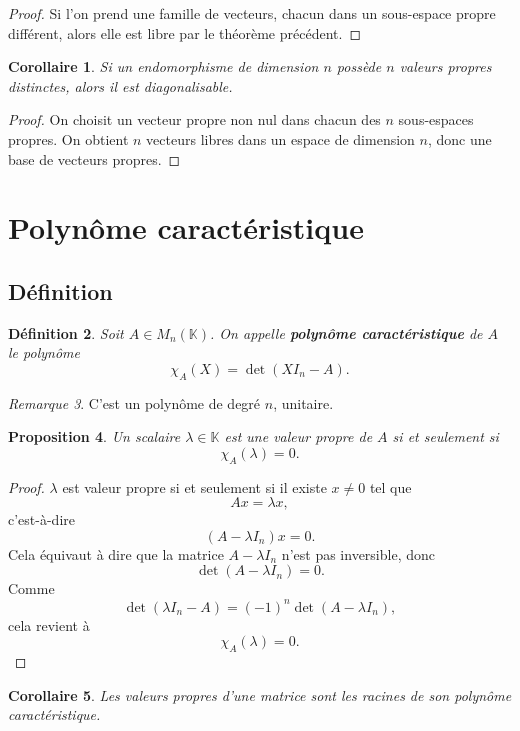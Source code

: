 \documentclass[11pt,a4paper]{article}
\newtheorem{definition}{Définition}[section]
\newtheorem{proposition}[definition]{Proposition}
\newtheorem{corollaire}[definition]{Corollaire}
\theoremstyle{remark}
\newtheorem{remarque}[definition]{Remarque}
\newcommand{\K}{\mathbb{K}}
\newcommand{\chiA}{\chi_A}
\begin{document}
\begin{proof}
Si l’on prend une famille de vecteurs, chacun dans un sous-espace propre différent, alors elle est libre par le théorème précédent.
\end{proof}

\begin{corollaire}
Si un endomorphisme de dimension \(n\) possède \(n\) valeurs propres distinctes, alors il est diagonalisable.
\end{corollaire}

\begin{proof}
On choisit un vecteur propre non nul dans chacun des \(n\) sous-espaces propres. On obtient \(n\) vecteurs libres dans un espace de dimension \(n\), donc une base de vecteurs propres.
\end{proof}

\section{Polynôme caractéristique}

\subsection{Définition}

\begin{definition}
Soit \(A\in M_n(\K)\).  
On appelle \textbf{polynôme caractéristique} de \(A\) le polynôme
\[
\chiA(X)=\det(XI_n-A).
\]
\end{definition}

\begin{remarque}
C’est un polynôme de degré \(n\), unitaire.
\end{remarque}

\begin{proposition}
Un scalaire \(\lambda\in\K\) est une valeur propre de \(A\) si et seulement si
\[
\chiA(\lambda)=0.
\]
\end{proposition}

\begin{proof}
\(\lambda\) est valeur propre si et seulement si il existe \(x\neq 0\) tel que
\[
Ax=\lambda x,
\]
c’est-à-dire
\[
(A-\lambda I_n)x=0.
\]
Cela équivaut à dire que la matrice \(A-\lambda I_n\) n’est pas inversible, donc
\[
\det(A-\lambda I_n)=0.
\]
Comme
\[
\det(\lambda I_n-A)=(-1)^n\det(A-\lambda I_n),
\]
cela revient à
\[
\chiA(\lambda)=0.
\]
\end{proof}

\begin{corollaire}
Les valeurs propres d’une matrice sont les racines de son polynôme caractéristique.
\end{corollaire}
\end{document}
